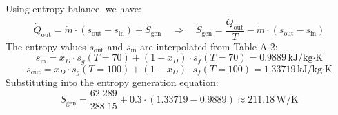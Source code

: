 Using entropy balance, we have:  
\[
\dot{Q}_{\text{out}} = \dot{m} \cdot (s_{\text{out}} - s_{\text{in}}) + \dot{S}_{\text{gen}} \quad \Rightarrow \quad \dot{S}_{\text{gen}} = \frac{\dot{Q}_{\text{out}}}{T} - \dot{m} \cdot (s_{\text{out}} - s_{\text{in}})
\]  
The entropy values \( s_{\text{out}} \) and \( s_{\text{in}} \) are interpolated from Table A-2:  
\[
s_{\text{in}} = x_D \cdot s_g(T=70) + (1 - x_D) \cdot s_f(T=70) = 0.9889 \, \text{kJ/kg·K}
\]  
\[
s_{\text{out}} = x_D \cdot s_g(T=100) + (1 - x_D) \cdot s_f(T=100) = 1.33719 \, \text{kJ/kg·K}
\]  
Substituting into the entropy generation equation:  
\[
\dot{S}_{\text{gen}} = \frac{62.289}{288.15} + 0.3 \cdot (1.33719 - 0.9889) \approx 211.18 \, \text{W/K}
\]